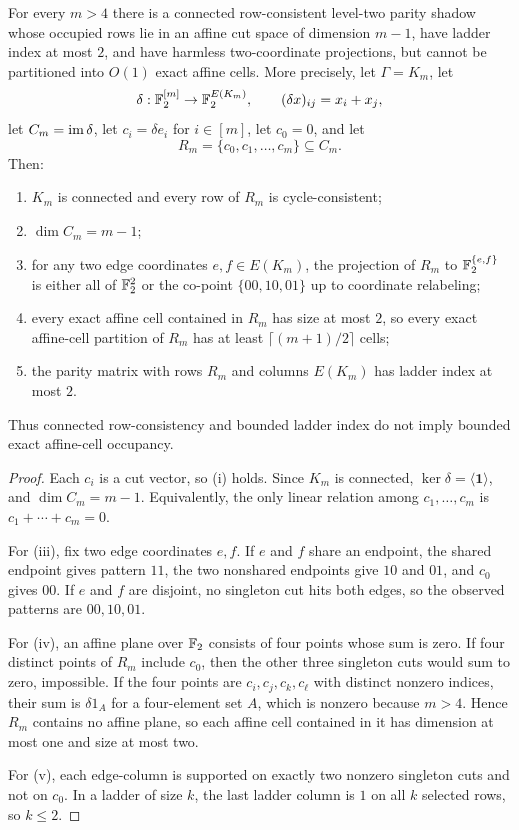 \begin{theorem}\label{thm:singleton-cut}
For every $m>4$ there is a connected row-consistent level-two parity shadow whose occupied rows lie in an affine cut space of dimension $m-1$, have ladder index at most $2$, and have harmless two-coordinate projections, but cannot be partitioned into $O(1)$ exact affine cells. More precisely, let $\Gamma=K_m$, let
\[
  \delta:\mathbb F_2^{[m]}\to \mathbb F_2^{E(K_m)},\qquad (\delta x)_{ij}=x_i+x_j,
\]
let $C_m=\operatorname{im}\delta$, let $c_i=\delta e_i$ for $i\in[m]$, let $c_0=0$, and let
\[
  R_m=\{c_0,c_1,\dots,c_m\}\subseteq C_m.
\]
Then:
\begin{enumerate}[label=(\roman*)]
\item $K_m$ is connected and every row of $R_m$ is cycle-consistent;
\item $\dim C_m=m-1$;
\item for any two edge coordinates $e,f\in E(K_m)$, the projection of $R_m$ to $\mathbb F_2^{\{e,f\}}$ is either all of $\mathbb F_2^2$ or the co-point $\{00,10,01\}$ up to coordinate relabeling;
\item every exact affine cell contained in $R_m$ has size at most $2$, so every exact affine-cell partition of $R_m$ has at least $\lceil(m+1)/2\rceil$ cells;
\item the parity matrix with rows $R_m$ and columns $E(K_m)$ has ladder index at most $2$.
\end{enumerate}
Thus connected row-consistency and bounded ladder index do not imply bounded exact affine-cell occupancy.
\end{theorem}

\begin{proof}
Each $c_i$ is a cut vector, so (i) holds. Since $K_m$ is connected, $\ker\delta=\langle \mathbf 1\rangle$, and $\dim C_m=m-1$. Equivalently, the only linear relation among $c_1,\dots,c_m$ is $c_1+\cdots+c_m=0$.

For (iii), fix two edge coordinates $e,f$. If $e$ and $f$ share an endpoint, the shared endpoint gives pattern $11$, the two nonshared endpoints give $10$ and $01$, and $c_0$ gives $00$. If $e$ and $f$ are disjoint, no singleton cut hits both edges, so the observed patterns are $00,10,01$.

For (iv), an affine plane over $\mathbb F_2$ consists of four points whose sum is zero. If four distinct points of $R_m$ include $c_0$, then the other three singleton cuts would sum to zero, impossible. If the four points are $c_i,c_j,c_k,c_\ell$ with distinct nonzero indices, their sum is $\delta 1_A$ for a four-element set $A$, which is nonzero because $m>4$. Hence $R_m$ contains no affine plane, so each affine cell contained in it has dimension at most one and size at most two.

For (v), each edge-column is supported on exactly two nonzero singleton cuts and not on $c_0$. In a ladder of size $k$, the last ladder column is $1$ on all $k$ selected rows, so $k\le 2$.
\end{proof}

